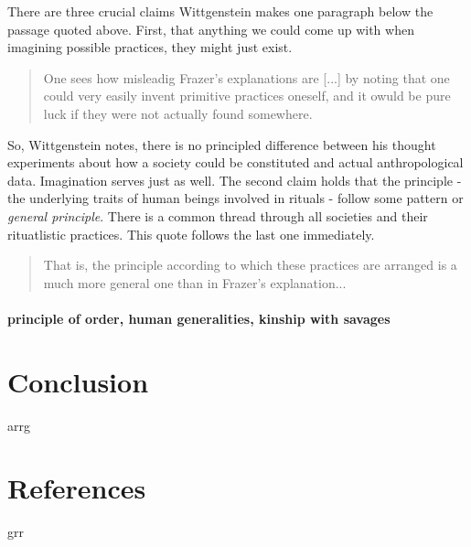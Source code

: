 \documentclass{article}
\begin{document}
There are three crucial claims Wittgenstein makes one paragraph below the passage quoted above. First, that anything we could come up with when imagining possible practices, they might just exist.
\begin{quote}
One sees how misleadig Frazer's explanations are [...] by noting that one could very easily invent primitive practices oneself, and it owuld be pure luck if they were not actually found somewhere.
\end{quote}
So, Wittgenstein notes, there is no principled difference between his thought experiments about how a society could be constituted and actual anthropological data. Imagination serves just as well.
The second claim holds that the principle - the underlying traits of human beings involved in rituals - follow some pattern or \textit{general principle}. There is a common thread through all societies and their rituatlistic practices. This quote follows the last one immediately.
\begin{quote}
That is, the principle according to which these practices are arranged is a much more general one than in Frazer's explanation...
\end{quote}

\paragraph{principle of order, human generalities, kinship with savages}
\paragraph{}



\section{Conclusion}
\hypertarget{sec4}{arrg}
\section{References}
\hypertarget{sec5}{grr}
\end{document}
